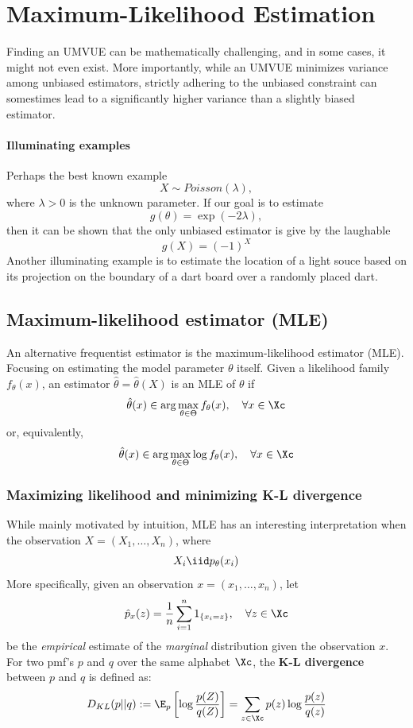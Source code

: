 \chapter{Maximum-Likelihood Estimation}

Finding an UMVUE can be mathematically challenging, and in some cases, it might not even exist. More importantly, while an UMVUE minimizes variance
among unbiased estimators, strictly adhering to the unbiased constraint can somestimes lead to a significantly higher variance than a slightly biased estimator.
\subsubsection{Illuminating examples}
Perhaps the best known example
\[
    X \sim Poisson(\lambda),
\]
where $\lambda > 0$ is the unknown parameter. If our goal is to estimate
\[
    g(\theta) = \exp(-2\lambda),
\]
then it can be shown that the only unbiased estimator is give by the laughable
\[
    \hat{g}(X) = (-1)^X
\]
Another illuminating example is to estimate the location of a light souce based on its projection on the boundary of
a dart board over a randomly placed dart.
\section{Maximum-likelihood estimator (MLE)}
An alternative frequentist estimator is the maximum-likelihood estimator (MLE). Focusing on estimating the model parameter $\theta$ itself. Given a likelihood
family $f_\theta(x)$, an estimator $\hat{\theta} = \hat{\theta}(X)$ is an MLE of $\theta$ if
\[
    \hat{\theta}(x) \in \arg\max_{\theta\in\Theta} f_\theta(x), \quad \forall x\in\Xc
\]
or, equivalently,
\[
    \hat{\theta}(x) \in \arg\max_{\theta\in\Theta} \log f_\theta(x), \quad \forall x\in\Xc
\]
\subsection{Maximizing likelihood and minimizing K-L divergence}
While mainly motivated by intuition, MLE has an interesting interpretation when the observation $X = (X_1, \dots, X_n)$, where
\[
    X_i \iid p_\theta(x_i)
\]
More specifically, given an observation $x = (x_1, \dots, x_n)$, let
\[
    \hat{p}_x (z) = \frac{1}{n}\sum_{i=1}^n 1_{\{x_i=z\}}, \quad \forall z \in\Xc
\]
be the \textit{empirical} estimate of the \textit{marginal} distribution given the observation $x$. For two pmf's $p$ and $q$
over the same alphabet $\Xc$, the \textbf{K-L divergence} between $p$ and $q$ is defined as:
\[
    D_{KL}(p || q) := \E_p \left[ \log\frac{p(Z)}{q(Z)} \right] = \sum_{z\in\Xc} p(z) \log \frac{p(z)}{q(z)}
\]
